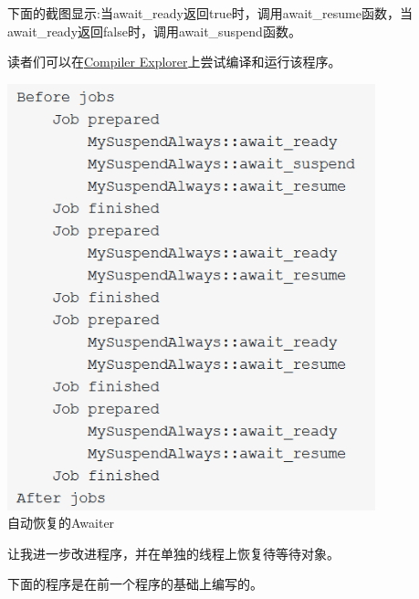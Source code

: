 下面的截图显示:当await\_ready返回true时，调用await\_resume函数，当await\_ready返回false时，调用await\_suspend函数。

读者们可以在\href{https://godbolt.org/z/8b1Y14}{Compiler Explorer}上尝试编译和运行该程序。

\begin{center}
\includegraphics[width=0.8\textwidth]{content/3/chapter7/images/20.png}\\
自动恢复的Awaiter
\end{center}

让我进一步改进程序，并在单独的线程上恢复待等待对象。


下面的程序是在前一个程序的基础上编写的。

